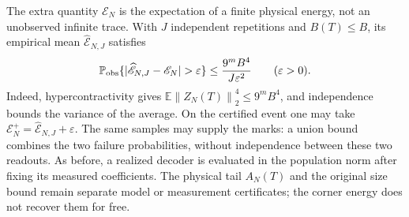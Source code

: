 \documentclass[11pt,a4paper]{amsart}
\numberwithin{equation}{section}
\theoremstyle{definition}
\theoremstyle{remark}
\newcommand{\E}{\mathbb E}
\newcommand{\Prob}{\mathbb P}
\newcommand{\norm}[1]{\left\lVert#1\right\rVert}
\begin{document}
The extra quantity $\mathscr E_N$ is the expectation of a finite physical energy, not an unobserved infinite trace. With $J$ independent repetitions and $B(T)\le B$, its empirical mean $\widehat{\mathscr E}_{N,J}$ satisfies
\begin{equation}\label{eq:finite_source_energy_sampling}
 \Prob_{\rm obs}\{|\widehat{\mathscr E}_{N,J}-\mathscr E_N|>\varepsilon\}
 \le\frac{9^mB^4}{J\varepsilon^2}\qquad(\varepsilon>0).
\end{equation}
Indeed, hypercontractivity gives
$\E\norm{Z_N(T)}_2^4\le9^mB^4$, and independence bounds the variance of the average. On the certified event one may take
$\mathscr E_N^+=\widehat{\mathscr E}_{N,J}+\varepsilon$.
The same samples may supply the marks: a union bound combines the two failure probabilities, without independence between these two readouts. As before, a realized decoder is evaluated in the population norm after fixing its measured coefficients. The physical tail $A_N(T)$ and the original size bound remain separate model or measurement certificates; the corner energy does not recover them for free.
\end{document}
